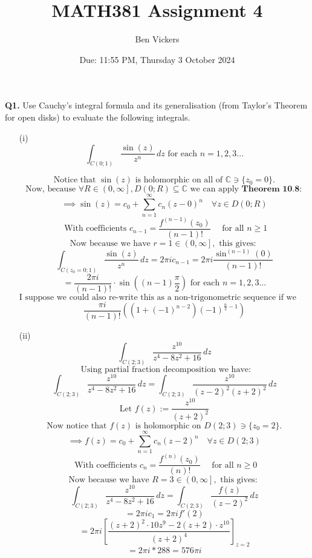 \documentclass[12pt]{article}
\title{MATH381 Assignment 4}
\author{Ben Vickers}
\date{Due: 11:55 PM, Thursday 3 October 2024}
\begin{document}
\maketitle

\noindent \textbf{Q1.} Use Cauchy's integral formula and its generalisation (from Taylor's Theorem for open disks) to evaluate the following integrals.
 
\begin{enumerate}
    \item[(i)] 
    \[
    \int_{C\left(0;1\right)} \frac{\sin\left(z\right)}{z^n} \, dz \text{ for each } n = 1,2,3 \dots
    \]

\[
\text{Notice that } \sin(z) \text{ is holomorphic on all of } \mathbb{C} \ni \{z_0 = 0\}.
\]
\[
\text{Now, because } \forall R \in \left(0, \infty\right], D\left(0;R\right) \subseteq \mathbb{C} \text{ we can apply } \textbf{Theorem 10.8}:
\]
\[
 \implies \sin(z) = c_0 + \sum_{n=1}^{\infty} c_n \left(z-0\right)^n \quad \forall z \in D\left(0;R\right) 
\]
\[ 
\text{ With coefficients } c_{n-1} = \frac{f^{(n-1)}(z_0)}{\left(n-1\right)!} \quad \text{ for all } n \geq 1
\]
\[
\text{Now because we have } r = 1 \in \left(0,\infty\right], \text{ this gives: }
\]
\[
    \int_{C\left({z_0 = 0};1\right)} \frac{\sin\left(z\right)}{z^n} \, dz = 2\pi i c_{n-1} = 2\pi i \frac{\sin^{\left(n-1\right)}(0)}{\left(n-1\right)!}
\]
\[
= \frac{2\pi i}{\left(n-1\right)!} \cdot \sin\left(\left(n-1\right)\frac{\pi}{2}\right) \text{ for each } n = 1,2,3 \dots
\]
\[
\text{I suppose we could also re-write this as a non-trigonometric sequence if we felt inclined:}
\]
\[
    \frac{\pi i}{\left(n-1\right)!} \left(\left(1+(-1)^{n-2}\right)\left(-1\right)^{\frac{n}{2}-1}\right)
\]

    \item[(ii)] 
    \[
    \int_{C\left(2;3\right)} \frac{z^{10}}{z^4-8z^2+16} \, dz
    \]
\[
\text{ Using partial fraction decomposition we have:}
\]
\[
    \int_{C\left(2;3\right)} \frac{z^{10}}{z^4-8z^2+16} \, dz =   \int_{C\left(2;3\right)} \frac{z^{10}}{\left(z-2\right)^2\left(z+2\right)^2} \, dz
\]
\[
\text{Let }f(z) := \frac{z^{10}}{\left(z+2\right)^2}
\]
\[
\text{Now notice that }f(z) \text{ is holomorphic on } D(2;3) \ni \{z_0 = 2\}. 
 \]
\[
\implies f(z) = c_0 + \sum_{n=1}^{\infty} c_n \left(z-2\right)^n \quad \forall z \in D\left(2;3\right) 
\]
\[
    \text{ With coefficients } c_{n} = \frac{f^{(n)}(z_0)}{\left(n\right)!} \quad \text{ for all } n \geq 0
\]
\[
\text{Now because we have } R = 3 \in \left(0,\infty\right], \text{ this gives: }
\]
\[
    \int_{C\left(2;3\right)} \frac{z^{10}}{z^4-8z^2+16} \, dz = \int_{C\left(2;3\right)} \frac{f(z)}{\left(z-2\right)^2} \,dz
    \]
\[
= 2\pi i c_1 = 2\pi i f'(2)
\]
\[
= 2\pi i \left[\frac{\left(z+2\right)^2\cdot 10z^9 - 2\left(z+2\right)\cdot z^{10}}{\left(z+2\right)^4}\right]_{z=2}
\]
\[
= 2\pi i * 288 = 576\pi i
\]

\end{enumerate}
\end{document}
